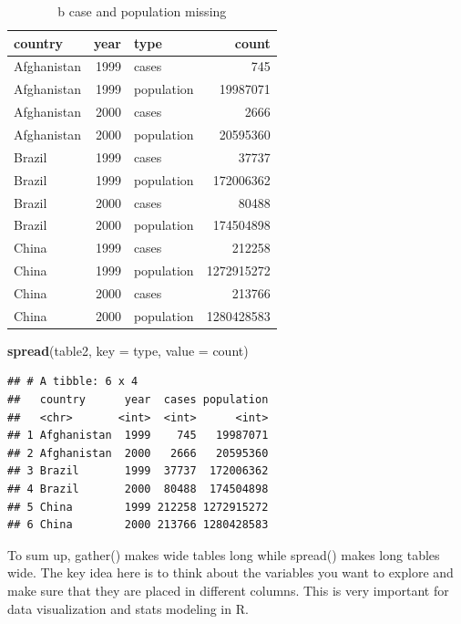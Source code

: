 \documentclass[]{book}
\newenvironment{Shaded}{\begin{snugshade}}{\end{snugshade}}
\newcommand{\KeywordTok}[1]{\textcolor[rgb]{0.13,0.29,0.53}{\textbf{#1}}}
\newcommand{\DataTypeTok}[1]{\textcolor[rgb]{0.13,0.29,0.53}{#1}}
\newcommand{\NormalTok}[1]{#1}
\begin{document}
\begin{table}[t]

\caption{\label{tab:unnamed-chunk-15}b case and population missing}
\centering
\begin{tabular}{l|r|l|r}
\hline
country & year & type & count\\
\hline
Afghanistan & 1999 & cases & 745\\
\hline
Afghanistan & 1999 & population & 19987071\\
\hline
Afghanistan & 2000 & cases & 2666\\
\hline
Afghanistan & 2000 & population & 20595360\\
\hline
Brazil & 1999 & cases & 37737\\
\hline
Brazil & 1999 & population & 172006362\\
\hline
Brazil & 2000 & cases & 80488\\
\hline
Brazil & 2000 & population & 174504898\\
\hline
China & 1999 & cases & 212258\\
\hline
China & 1999 & population & 1272915272\\
\hline
China & 2000 & cases & 213766\\
\hline
China & 2000 & population & 1280428583\\
\hline
\end{tabular}
\end{table}

\begin{Shaded}
\begin{Highlighting}[]
\KeywordTok{spread}\NormalTok{(table2, }\DataTypeTok{key =}\NormalTok{ type, }\DataTypeTok{value =}\NormalTok{ count)}
\end{Highlighting}
\end{Shaded}

\begin{verbatim}
## # A tibble: 6 x 4
##   country      year  cases population
##   <chr>       <int>  <int>      <int>
## 1 Afghanistan  1999    745   19987071
## 2 Afghanistan  2000   2666   20595360
## 3 Brazil       1999  37737  172006362
## 4 Brazil       2000  80488  174504898
## 5 China        1999 212258 1272915272
## 6 China        2000 213766 1280428583
\end{verbatim}

To sum up, gather() makes wide tables long while spread() makes long
tables wide. The key idea here is to think about the variables you want
to explore and make sure that they are placed in different columns. This
is very important for data visualization and stats modeling in R.
\end{document}
